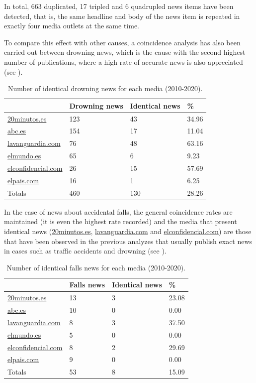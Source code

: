 In total, 663 duplicated, 17 tripled and 6 quadrupled news items have
been detected, that is, the same headline and body of the news item is
repeated in exactly four media outlets at the same time.

To compare this effect with other causes, a coincidence analysis has
also been carried out between drowning news, which is the cause with the
second highest number of publications, where a high rate of accurate
news is also appreciated (see ).

\begin{table}[!htpb]
\centering
\begin{threeparttable}
\caption{Number of identical drowning news for each media (2010-2020).}
\label{tab-03}
\begin{tabular}{*{4}{l}}
\toprule
& Drowning news & Identical news &\% \\
\midrule
\url{20minutos.es} & 123 & 43 & 34.96 \\
\url{abc.es} & 154 & 17 & 11.04 \\
\url{lavanguardia.com} & 76 & 48 & 63.16 \\
\url{elmundo.es} & 65 & 6 & 9.23 \\
\url{elconfidencial.com} & 26 & 15 & 57.69 \\
\url{elpais.com} & 16 & 1 & 6.25 \\
Totals & 460 & 130 & 28.26 \\
\bottomrule
\end{tabular}
\end{threeparttable}
\end{table}

In the case of news about accidental falls, the general coincidence
rates are maintained (it is even the highest rate recorded) and the
media that present identical news (\url{20minutos.es}, \url{lavanguardia.com}
and \url{elconfidencial.com}) are those that have been observed in the
previous analyzes that usually publish exact news in cases such as
traffic accidents and drowning (see ).

\begin{table}[!htpb]
\centering
\begin{threeparttable}
\caption{Number of identical falls news for each media (2010-2020).}
\label{tab-04}
\begin{tabular}{*{4}{l}}
\toprule
& Falls news & Identical news &\%\\
\midrule
\url{20minutos.es} & 13 & 3 & 23.08 \\
\url{abc.es} & 10 & 0 & 0.00 \\
\url{lavanguardia.com} & 8 & 3 & 37.50 \\
\url{elmundo.es} & 5 & 0 & 0.00 \\
\url{elconfidencial.com} & 8 & 2 & 29.69 \\
\url{elpais.com} & 9 & 0 & 0.00 \\
Totals & 53 & 8 & 15.09 \\
\bottomrule
\end{tabular}
\end{threeparttable}
\end{table}

